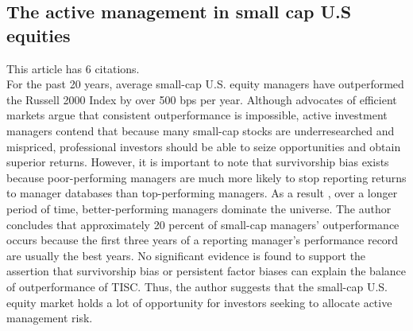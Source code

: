 \documentclass[12 pt]{article}
\begin{document}
\subsection{The active management in small cap U.S equities}
This article has 6 citations. \\
For the past 20 years, average small-cap U.S. equity managers have outperformed the Russell 2000 Index by over 500 bps per year. Although advocates of efficient markets argue that consistent outperformance is impossible, active investment managers contend that because many small-cap stocks are underresearched and mispriced, professional investors should be able to seize opportunities and obtain superior returns. However, it is important to note that survivorship bias exists because poor-performing managers are
much more likely to stop reporting returns to manager databases than top-performing managers. As a result , over a longer period of time, better-performing managers dominate the universe. The author concludes that approximately 20 percent of small-cap
managers’ outperformance occurs because the first three years of a reporting manager’s performance record are usually the best years. No significant evidence is found to support the assertion that survivorship bias or persistent factor biases can explain the balance of outperformance of TISC. Thus, the author suggests that the small-cap U.S. equity market holds a lot of opportunity for investors seeking to allocate active management risk.
\end{document}
